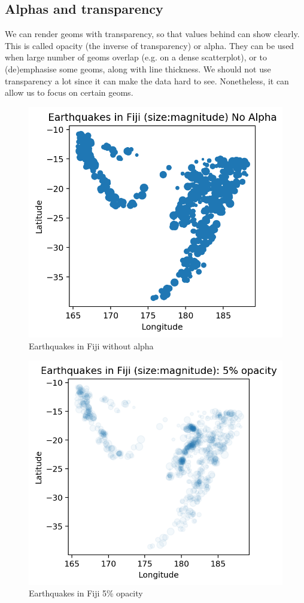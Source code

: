 \documentclass[a4paper, openany]{memoir}
\begin{document}
\subsection{Alphas and transparency}
We can render geoms with transparency, so that values behind can show clearly. This is called opacity (the inverse of transparency) or alpha. They can be used when large number of geoms overlap (e.g. on a dense scatterplot), or to (de)emphasise some geoms, along with line thickness. We should not use transparency a lot since it can make the data hard to see. Nonetheless, it can allow us to focus on certain geoms.
\begin{figure}[H]
    \centering
    \includegraphics[scale=0.6]{src/2.51 Fiji Example Plot 4.png}
    \caption{Earthquakes in Fiji without alpha}
\end{figure}
\begin{figure}[H]
    \centering
    \includegraphics[scale=0.6]{src/2.52 Fiji example Plot 5.png}
    \caption{Earthquakes in Fiji 5\% opacity}
\end{figure}
\newpage
\end{document}
